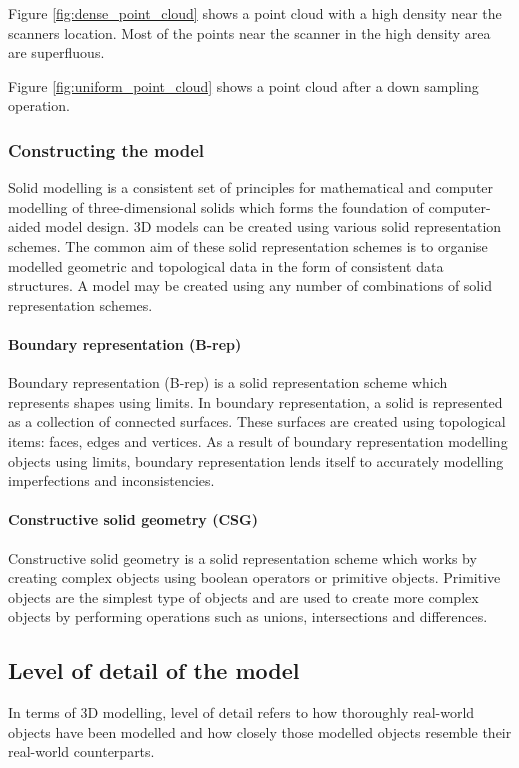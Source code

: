 \documentclass[11pt,a4paper]{report}
\begin{document}
						Figure \ref{fig:dense_point_cloud} shows a point cloud with a high density near the scanners location. Most of the points near the scanner in the high density area are superfluous.
						
						Figure \ref{fig:uniform_point_cloud} shows a point cloud after a down sampling operation.
				
			\subsubsection{Constructing the model}
				Solid modelling is a consistent set of principles for mathematical and computer modelling of three-dimensional solids which forms the foundation of computer-aided model design. 
				\cite{vadim_shapiro_solid_2001}
				3D models can be created using various solid representation schemes. The common aim of these solid representation schemes is to organise modelled geometric and topological data in the form of consistent data structures. A model may be created using any number of combinations of solid representation schemes.
				
				\paragraph{Boundary representation (B-rep)}
					Boundary representation (B-rep) is a solid representation scheme which represents shapes using limits. In boundary representation, a solid is represented as a collection of connected surfaces. These surfaces are created using topological items: faces, edges and vertices. As a result of boundary representation modelling objects using limits, boundary representation lends itself to accurately modelling imperfections and inconsistencies.
					\cite{hongxin_zhang_introduction_2007}
				
				\paragraph{Constructive solid geometry (CSG)}
					Constructive solid geometry is a solid representation scheme which works by creating complex objects using boolean operators or primitive objects. Primitive objects are the simplest type of objects and are used to create more complex objects by performing operations such as unions, intersections and differences.
					\cite{foley_computer_1996}
				
		\subsection{Level of detail of the model}
			In terms of 3D modelling, level of detail refers to how thoroughly real-world objects have been modelled and how closely those modelled objects resemble their real-world counterparts.
			
\end{document}
